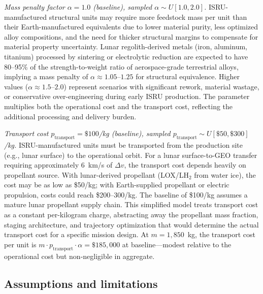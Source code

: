 \documentclass[preprint,12pt]{elsarticle}
\begin{document}
\emph{Mass penalty factor $\alpha = 1.0$ (baseline), sampled $\alpha \sim U[1.0, 2.0]$.} ISRU-manufactured structural units may require more feedstock mass per unit than their Earth-manufactured equivalents due to lower material purity, less optimized alloy compositions, and the need for thicker structural margins to compensate for material property uncertainty. Lunar regolith-derived metals (iron, aluminum, titanium) processed by sintering or electrolytic reduction are expected to have 80--95\% of the strength-to-weight ratio of aerospace-grade terrestrial alloys, implying a mass penalty of $\alpha \approx 1.05$--$1.25$ for structural equivalence. Higher values ($\alpha \approx 1.5$--$2.0$) represent scenarios with significant rework, material wastage, or conservative over-engineering during early ISRU production. The parameter multiplies both the operational cost and the transport cost, reflecting the additional processing and delivery burden.

\emph{Transport cost $p_{\mathrm{transport}} = \$100$/kg (baseline), sampled $p_{\mathrm{transport}} \sim U[\$50, \$300]$/kg.} ISRU-manufactured units must be transported from the production site (e.g., lunar surface) to the operational orbit. For a lunar surface-to-GEO transfer requiring approximately 6~km/s of $\Delta v$, the transport cost depends heavily on propellant source. With lunar-derived propellant (LOX/LH$_2$ from water ice), the cost may be as low as \$50/kg; with Earth-supplied propellant or electric propulsion, costs could reach \$200--300/kg. The baseline of \$100/kg assumes a mature lunar propellant supply chain. This simplified model treats transport cost as a constant per-kilogram charge, abstracting away the propellant mass fraction, staging architecture, and trajectory optimization that would determine the actual transport cost for a specific mission design. At $m = 1{,}850$~kg, the transport cost per unit is $m \cdot p_{\mathrm{transport}} \cdot \alpha = \$185{,}000$ at baseline---modest relative to the operational cost but non-negligible in aggregate.

\subsection{Assumptions and limitations}
\end{document}

